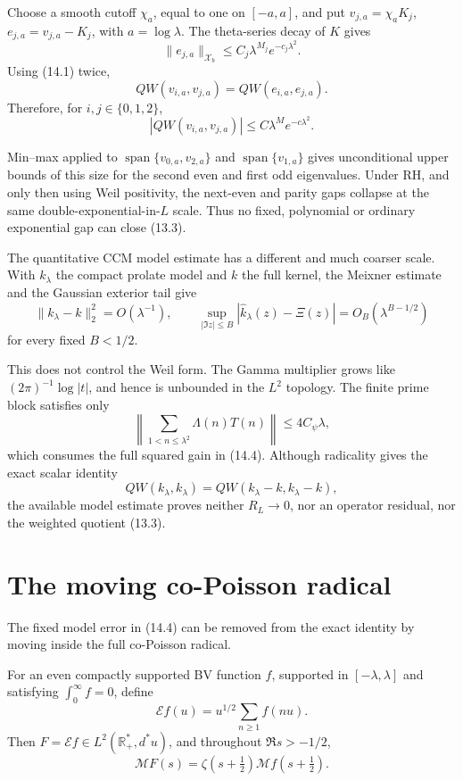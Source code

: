 \documentclass[11pt]{amsart}
\theoremstyle{definition}
\theoremstyle{remark}
\newcommand{\R}{\mathbb R}
\newcommand{\XiR}{\Xi}
\begin{document}
Choose a smooth cutoff \(\chi_a\), equal to one on \([-a,a]\), and put
\(v_{j,a}=\chi_aK_j\), \(e_{j,a}=v_{j,a}-K_j\), with
\(a=\log\lambda\).  The theta-series decay of \(K\) gives
\[
 \|e_{j,a}\|_{\mathcal X_b}
 \le C_j\lambda^{M_j}e^{-c_j\lambda^2}.
\]
Using (14.1) twice,
\[
 QW(v_{i,a},v_{j,a})=QW(e_{i,a},e_{j,a}).
\]
Therefore, for \(i,j\in\{0,1,2\}\),
\[
 \boxed{
 |QW(v_{i,a},v_{j,a})|
 \le C\lambda^Me^{-c\lambda^2}.}
 \tag{14.3}
\]

Min--max applied to \(\operatorname{span}\{v_{0,a},v_{2,a}\}\) and
\(\operatorname{span}\{v_{1,a}\}\) gives unconditional upper bounds of
this size for the second even and first odd eigenvalues.  Under RH, and
only then using Weil positivity, the next-even and parity gaps collapse at
the same double-exponential-in-\(L\) scale.  Thus no fixed, polynomial or
ordinary exponential gap can close (13.3).

The quantitative CCM model estimate has a different and much coarser
scale.  With \(k_\lambda\) the compact prolate model and \(k\) the full
kernel, the Meixner estimate and the Gaussian exterior tail give
\[
 \boxed{
 \|k_\lambda-k\|_2^2=O(\lambda^{-1}),
 \qquad
 \sup_{|\Im z|\le B}|\widehat k_\lambda(z)-\XiR(z)|
 =O_B(\lambda^{B-1/2})}
 \tag{14.4}
\]
for every fixed \(B<1/2\).

This does not control the Weil form.  The Gamma multiplier grows like
\((2\pi)^{-1}\log|t|\), and hence is unbounded in the \(L^2\) topology.
The finite prime block satisfies only
\[
 \left\|\sum_{1<n\le\lambda^2}\Lambda(n)T(n)\right\|
 \le4C_\psi\lambda,
 \tag{14.5}
\]
which consumes the full squared gain in (14.4).  Although radicality gives
the exact scalar identity
\[
 QW(k_\lambda,k_\lambda)=QW(k_\lambda-k,k_\lambda-k),
 \tag{14.6}
\]
the available model estimate proves neither \(R_L\to0\), nor an operator
residual, nor the weighted quotient (13.3).

\section{The moving co-Poisson radical}
\label{sec:moving}

The fixed model error in (14.4) can be removed from the exact identity by
moving inside the full co-Poisson radical.

For an even compactly supported BV function \(f\), supported in
\([-\lambda,\lambda]\) and satisfying \(\int_0^\infty f=0\), define
\[
 \mathcal E f(u)=u^{1/2}\sum_{n\ge1}f(nu).
 \tag{15.1}
\]
Then \(F=\mathcal E f\in L^2(\R_+^*,d^*u)\), and throughout
\(\Re s>-1/2\),
\[
 \boxed{
 \mathcal MF(s)=\zeta(s+\tfrac12)\mathcal Mf(s+\tfrac12).}
 \tag{15.2}
\]
\end{document}
